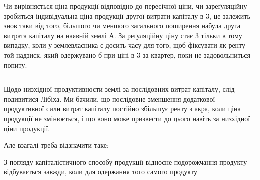 Чи вирівняється ціна продукції відповідно до пересічної ціни, чи зареґуляційну
зробиться індивідуальна ціна продукції другої витрати капіталу в 3,
це залежить знов таки від того, більшого чи меншого загального поширення набула
друга витрата капіталу на наявній землі $А$. За реґуляційну ціну стає 3 тільки в тому випадку, коли у землевласника є досить часу для того,
щоб фіксувати як ренту той надзиск, який одержувано б при ціні в 3 за квартер, поки не задовольниться попиту.

\pfbreak

Щодо низхідної продуктивности землі за послідовних витрат капіталу,
слід подивитися Лібіха. Ми бачили, що послідовне зменшення додаткової продуктивної
сили витрат капіталу постійно збільшує ренту з акра, коли ціна
продукції не змінюється, і що воно може призвести до цього навіть за низхідної
ціни продукції.

Але взагалі треба відзначити таке:

З погляду капіталістичного способу продукції відносне подорожчання
продукту відбувається завжди, коли для одержання того самого продукту
\parbreak{}  %

